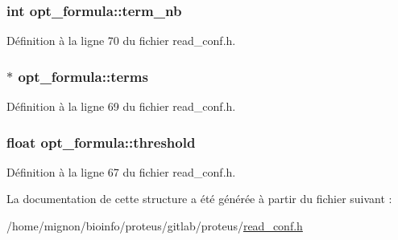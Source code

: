 \hypertarget{structopt__formula_a88d621da87e6c9a3787c7e69d78d8a69}{
\subsubsection[{term\+\_\+nb}]{\setlength{\rightskip}{0pt plus 5cm}int opt\+\_\+formula\+::term\+\_\+nb}}\label{structopt__formula_a88d621da87e6c9a3787c7e69d78d8a69}


Définition à la ligne 70 du fichier read\+\_\+conf.\+h.

\hypertarget{structopt__formula_a26227308e487fa63c9a10bba39a856b0}{
\subsubsection[{terms}]{$\ast$ opt\+\_\+formula\+::terms}}\label{structopt__formula_a26227308e487fa63c9a10bba39a856b0}


Définition à la ligne 69 du fichier read\+\_\+conf.\+h.

\hypertarget{structopt__formula_abbe0c9a081cd5aea377286c914e5371c}{
\subsubsection[{threshold}]{\setlength{\rightskip}{0pt plus 5cm}float opt\+\_\+formula\+::threshold}}\label{structopt__formula_abbe0c9a081cd5aea377286c914e5371c}


Définition à la ligne 67 du fichier read\+\_\+conf.\+h.



La documentation de cette structure a été générée à partir du fichier suivant \+:\begin{DoxyCompactItemize}
\item 
/home/mignon/bioinfo/proteus/gitlab/proteus/\hyperlink{read__conf_8h}{read\+\_\+conf.\+h}\end{DoxyCompactItemize}
